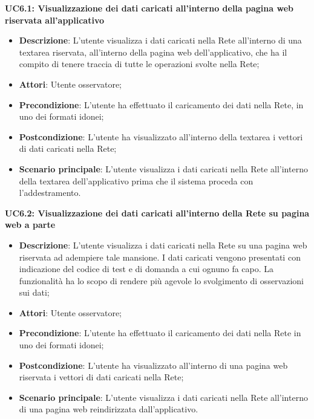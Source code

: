 \textbf{UC6.1: Visualizzazione dei dati caricati all'interno della pagina web riservata all'applicativo}\mbox{}
\label{UC6.1: Visualizzazione dei dati caricati all'interno della pagina web riservata all'applicativo}
\noindent
\begin{itemize}
\item \textbf{Descrizione}: L'utente visualizza i dati caricati nella Rete all'interno di una textarea riservata, all'interno della pagina web dell'applicativo, che ha il compito di tenere traccia di tutte le operazioni svolte nella Rete;
\item \textbf{Attori}: Utente osservatore;
\item \textbf{Precondizione}: L'utente ha  effettuato il caricamento dei dati nella Rete, in uno dei formati idonei;
\item \textbf{Postcondizione}: L'utente ha visualizzato all'interno della textarea i vettori di dati caricati nella Rete;
\item \textbf{Scenario principale}: L'utente visualizza i dati caricati nella Rete all'interno della textarea dell'applicativo prima che il sistema proceda con l'addestramento.
\end{itemize}

\textbf{UC6.2: Visualizzazione dei dati caricati all'interno della Rete su pagina web a parte}\mbox{}
\label{UC6.2: Visualizzazione dei dati caricati all'interno della Rete su pagina web a parte}
\noindent
\begin{itemize}
\item \textbf{Descrizione}: L'utente visualizza i dati caricati nella Rete su una pagina web riservata ad adempiere tale mansione. I dati caricati vengono presentati con indicazione del codice di test e di domanda a cui ognuno fa capo. La funzionalit\`a ha lo scopo di rendere pi\`u agevole lo svolgimento di osservazioni sui dati;
\item \textbf{Attori}: Utente osservatore;
\item \textbf{Precondizione}: L'utente ha  effettuato il caricamento dei dati nella Rete in uno dei formati idonei;
\item \textbf{Postcondizione}: L'utente ha visualizzato all'interno di una pagina web riservata i vettori di dati caricati nella Rete;
\item \textbf{Scenario principale}: L'utente visualizza i dati caricati nella Rete all'interno di una pagina web reindirizzata dall'applicativo.
\end{itemize}

